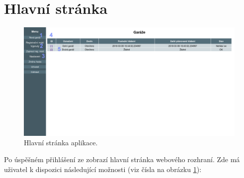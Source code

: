 \newpage

\section{Hlavní stránka}

\begin{figure}[h!]
    \centering
    \includegraphics[width=\textwidth]{images/mainpage.png}
    \caption[Hlavní stránka aplikace]{Hlavní stránka aplikace.}
    \label{fig:mainpage}
\end{figure}

Po úspěšném přihlášení ze zobrazí hlavní stránka webového rozhraní. Zde má uživatel k dispozici následující možnosti (viz čísla na obrázku \ref{fig:mainpage}):

